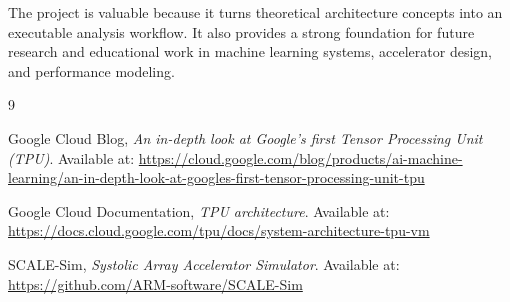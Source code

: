 \documentclass[12pt,a4paper]{article}
\begin{document}
	The project is valuable because it turns theoretical architecture concepts into an executable analysis workflow. It also provides a strong foundation for future research and educational work in machine learning systems, accelerator design, and performance modeling.
	
	\begin{thebibliography}{9}
		
		Google Cloud Blog,
		\textit{An in-depth look at Google's first Tensor Processing Unit (TPU)}.
		Available at: \url{https://cloud.google.com/blog/products/ai-machine-learning/an-in-depth-look-at-googles-first-tensor-processing-unit-tpu}
		
		Google Cloud Documentation,
		\textit{TPU architecture}.
		Available at: \url{https://docs.cloud.google.com/tpu/docs/system-architecture-tpu-vm}
		
		SCALE-Sim,
		\textit{Systolic Array Accelerator Simulator}.
		Available at: \url{https://github.com/ARM-software/SCALE-Sim}
		
	\end{thebibliography}
	
\end{document}
